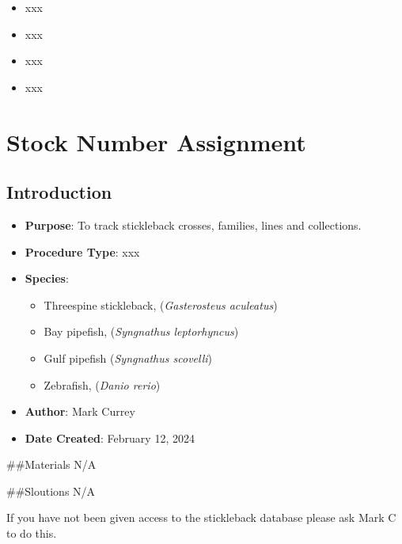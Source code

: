 \documentclass[
  letterpaper,
  DIV=11,
  numbers=noendperiod]{scrreprt}
\providecommand{\tightlist}{%
  \setlength{\itemsep}{0pt}\setlength{\parskip}{0pt}}\usepackage{longtable,booktabs,array}
\begin{document}
\begin{itemize}
\tightlist
\item
  xxx
\item
  xxx
\item
  xxx
\item
  xxx
\end{itemize}

\hypertarget{sec-husbandry-stickleback_database_use}{%
\chapter{Stock Number
Assignment}\label{sec-husbandry-stickleback_database_use}}

\hypertarget{introduction-36}{%
\section{Introduction}\label{introduction-36}}

\begin{itemize}
\tightlist
\item
  \textbf{Purpose}: To track stickleback crosses, families, lines and
  collections.
\item
  \textbf{Procedure Type}: xxx
\item
  \textbf{Species}:

  \begin{itemize}
  \tightlist
  \item
    Threespine stickleback, (\emph{Gasterosteus aculeatus})
  \item
    Bay pipefish, (\emph{Syngnathus leptorhyncus})
  \item
    Gulf pipefish (\emph{Syngnathus scovelli})
  \item
    Zebrafish, (\emph{Danio rerio})
  \end{itemize}
\item
  \textbf{Author}: Mark Currey\\
\item
  \textbf{Date Created}: February 12, 2024
\end{itemize}

\#\#Materials N/A

\#\#Sloutions N/A

\begin{tcolorbox}[enhanced jigsaw, toprule=.15mm, breakable, coltitle=black, leftrule=.75mm, title=\textcolor{quarto-callout-warning-color}{\faExclamationTriangle}\hspace{0.5em}{NOTE}, bottomrule=.15mm, toptitle=1mm, bottomtitle=1mm, colframe=quarto-callout-warning-color-frame, opacityback=0, colback=white, opacitybacktitle=0.6, colbacktitle=quarto-callout-warning-color!10!white, rightrule=.15mm, titlerule=0mm, arc=.35mm, left=2mm]

If you have not been given access to the stickleback database please ask
Mark C to do this.

\end{tcolorbox}
\end{document}
